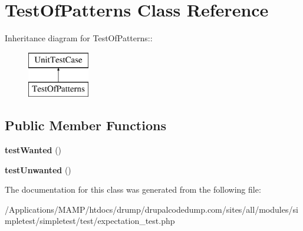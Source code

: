 \hypertarget{class_test_of_patterns}{
\section{TestOfPatterns Class Reference}
\label{class_test_of_patterns}
}
Inheritance diagram for TestOfPatterns::\begin{figure}[H]
\begin{center}
\leavevmode
\includegraphics[height=2cm]{class_test_of_patterns}
\end{center}
\end{figure}
\subsection*{Public Member Functions}
\begin{DoxyCompactItemize}
\item 
\hypertarget{class_test_of_patterns_a7cdfd2266987ae9776a22edc5538b765}{
{\bfseries testWanted} ()}
\label{class_test_of_patterns_a7cdfd2266987ae9776a22edc5538b765}

\item 
\hypertarget{class_test_of_patterns_ae96821017dcd2a2bbb1c8041fc20d74c}{
{\bfseries testUnwanted} ()}
\label{class_test_of_patterns_ae96821017dcd2a2bbb1c8041fc20d74c}

\end{DoxyCompactItemize}


The documentation for this class was generated from the following file:\begin{DoxyCompactItemize}
\item 
/Applications/MAMP/htdocs/drump/drupalcodedump.com/sites/all/modules/simpletest/simpletest/test/expectation\_\-test.php\end{DoxyCompactItemize}
